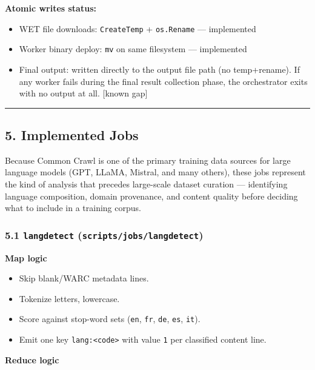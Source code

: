 \documentclass[
]{article}
\providecommand{\tightlist}{%
  \setlength{\itemsep}{0pt}\setlength{\parskip}{0pt}}
\begin{document}
\textbf{Atomic writes status:}
\begin{itemize}
\tightlist
\item
  WET file downloads: \texttt{CreateTemp} + \texttt{os.Rename} ---
  implemented \checkmark
\item
  Worker binary deploy: \texttt{mv} on same filesystem ---
  implemented \checkmark
\item
  Final output: written directly to the output file path (no
  temp+rename). If any worker fails during the final result collection
  phase, the orchestrator exits with no output at all. {[}known gap{]}
\end{itemize}

\begin{center}\rule{0.5\linewidth}{0.5pt}\end{center}

\subsection{5. Implemented Jobs}\label{implemented-jobs}

Because Common Crawl is one of the primary training data sources for
large language models (GPT, LLaMA, Mistral, and many others), these
jobs represent the kind of analysis that precedes large-scale dataset
curation --- identifying language composition, domain provenance, and
content quality before deciding what to include in a training corpus.

\subsubsection{\texorpdfstring{5.1 \texttt{langdetect}
(\texttt{scripts/jobs/langdetect})}{5.1 langdetect (scripts/jobs/langdetect)}}\label{langdetect-scriptsjobslangdetect}

\textbf{Map logic}

\begin{itemize}
\tightlist
\item
  Skip blank/WARC metadata lines.
\item
  Tokenize letters, lowercase.
\item
  Score against stop-word sets (\texttt{en}, \texttt{fr}, \texttt{de},
  \texttt{es}, \texttt{it}).
\item
  Emit one key \texttt{lang:\textless{}code\textgreater{}} with value
  \texttt{1} per classified content line.
\end{itemize}

\textbf{Reduce logic}
\end{document}
